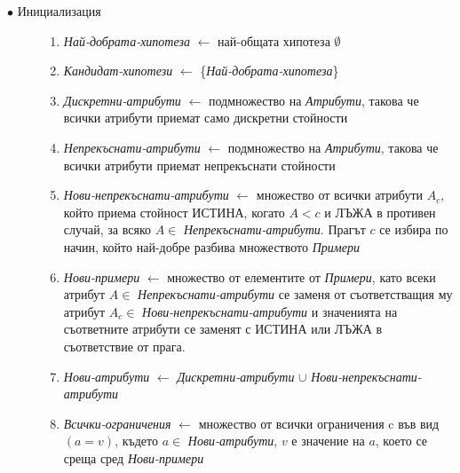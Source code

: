 \documentclass{article}
\begin{document}
\begin{description}
	\item [$\bullet$ Инициализация]\mbox{}
	\begin{enumerate}
	  \item \textit{Най-добрата-хипотеза} $\leftarrow$ най-общата хипотеза $\emptyset$
	  \item \textit{Кандидат-хипотези} $\leftarrow$ \{\textit{Най-добрата-хипотеза}\}
	  \item \textit{Дискретни-атрибути} $\leftarrow$ подмножество на \textit{Атрибути}, такова че всички атрибути приемат само дискретни стойности
	  \item \textit{Непрекъснати-атрибути} $\leftarrow$ подмножество на \textit{Атрибути}, такова че всички атрибути приемат непрекъснати стойности
	  \item \textit{Нови-непрекъснати-атрибути} $\leftarrow$ множество от всички атрибути $A_c$, който приема стойност ИСТИНА, когато $A < c$ и ЛЪЖА в противен случай, за всяко $A \in$ \textit{Непрекъснати-атрибути}. Прагът $c$ се избира по начин, който най-добре разбива множеството \textit{Примери}
	  \item \textit{Нови-примери} $\leftarrow$ множество от елементите от \textit{Примери}, като всеки атрибут $A \in$ \textit{Непрекъснати-атрибути} се заменя от съответстващия му атрибут $A_c \in$ \textit{Нови-непрекъснати-атрибути} и значенията на съответните атрибути се заменят с ИСТИНА или ЛЪЖА в съответствие от прага.
	  \item \textit{Нови-атрибути} $\leftarrow$ \textit{Дискретни-атрибути} $\cup$ \textit{Нови-непрекъснати-атрибути}
	  \item \textit{Всички-ограничения} $\leftarrow$ множество от всички ограничения c във вид $(a = v)$, където $a \in$ \textit{Нови-атрибути}, $v$ е значение на $a$, което се среща сред \textit{Нови-примери}
	  

\end{enumerate}
\end{description}
\end{document}
